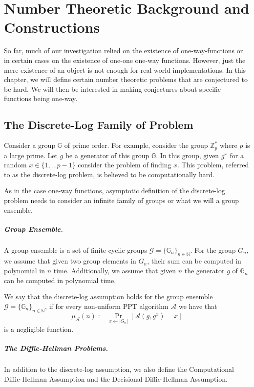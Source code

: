 \chapter{Number Theoretic Background and Constructions}
So far, much of our investigation relied on the existence of one-way-functions or in certain cases on the existence of one-one one-way functions. However, just the mere existence of an object is not enough for real-world implementations. In this chapter, we will define certain number theoretic problems that are conjectured to be hard. We will then be interested in making conjectures about specific functions being one-way.

\section{The Discrete-Log Family of Problem}
Consider a group $\mathbb{G}$ of prime order. For example, consider the group $\mathbb{Z}_p^*$ where $p$ is a large prime. Let $g$ be a generator of this group $\mathbb{G}$. In this group, given $g^x$ for a random $x \in \{1,\ldots p-1\}$ consider the problem of finding $x$. This problem, referred to as the discrete-log problem, is believed to be computationally hard.

As in the case one-way functions, asymptotic definition of the discrete-log problem needs to consider an infinite family of groups or what we will a group ensemble. 

\paragraph{Group Ensemble.} A group ensemble is a set of finite cyclic groups $\mathcal{G} =\{ \mathbb{G}_n\}_{n \in \mathbb{N}}$. For the group $G_n$, we assume that given two group elements in $G_n$, their sum can be computed in polynomial in $n$ time. Additionally, we assume that given $n$ the generator $g$ of $\mathbb{G}_n$ can be computed in polynomial time. 

\begin{definition}
We say that the discrete-log assumption holds for the group ensemble $\mathcal{G} =\{ \mathbb{G}_n\}_{n \in \mathbb{N}}$, if for every non-uniform PPT algorithm $\mathcal{A}$ we have that
\[\mu_\mathcal{A}(n) := \Pr_{x \leftarrow |G_n|}[\mathcal{A}(g,g^x) = x]\]
is a negligible function.
\end{definition}

\paragraph{The Diffie-Hellman Problems.} In addition to the discrete-log assumption, we also define the Computational Diffie-Hellman Assumption and the Decisional Diffie-Hellman Assumption. 

